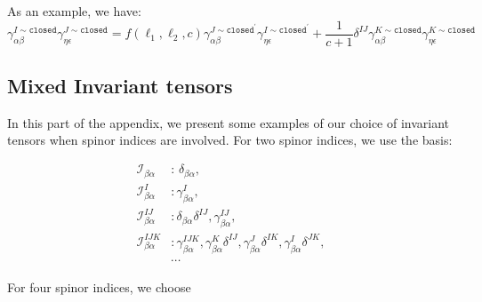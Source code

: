 \documentclass[11pt]{article}
\begin{document}
As an example, we have:
\begin{equation}
    \gamma^{I \sim \texttt{closed}}_{\alpha\beta} \gamma^{J \sim \texttt{closed}}_{\eta\epsilon} = f(\ell_1, \ell_2, c)\gamma_{\alpha\beta}^{J \sim \texttt{closed}^{'}} \gamma_{\eta\epsilon}^{I \sim \texttt{closed}^{'}} + \frac{1}{c+1} \delta^{IJ}\gamma^{K \sim \texttt{closed}}_{\alpha\beta} \gamma^{K \sim \texttt{closed}}_{\eta\epsilon}
\end{equation}
\subsection{Mixed Invariant tensors}
In this part of the appendix, we present some examples of our choice of invariant tensors when spinor indices are involved. For two spinor indices, we use the basis: %
\begin{small}
\begin{equation}
\begin{split}
    \mathcal{I}_{\beta\alpha}&: \, \delta _{\beta \alpha }, \\
    \mathcal{I}^I_{\beta\alpha}&: {\gamma _{\beta \alpha }^{I}}, \\
    \mathcal{I}^{IJ}_{\beta\alpha}&: {\delta _{\beta \alpha }\delta^{IJ}, \gamma _{\beta \alpha } ^{IJ}}, \\
    \mathcal{I}^{IJK}_{\beta\alpha}&: {\gamma _{\beta \alpha }^{IJK}, \gamma _{\beta \alpha }^{K}\delta ^{IJ}, \gamma _{\beta \alpha }^{J}\delta ^{IK}, \gamma _{\beta \alpha }^{I}\delta ^{JK}}, \\
    & \cdots
\end{split}
\end{equation}
\end{small}
For four spinor indices, we choose %
\end{document}
